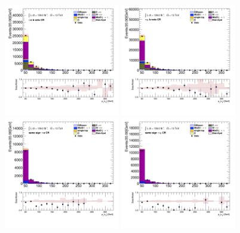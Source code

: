 		\begin{figure}[!thp]
			\begin{center}    
			\includegraphics[width=0.45\textwidth]{chapters/chapter6_HPlus/images/taulep/tau_0_pt_TAUEL_BVETO.png} 
			\includegraphics[width=0.45\textwidth]{chapters/chapter6_HPlus/images/taulep/tau_0_pt_TAUMU_BVETO.png} \\
			\includegraphics[width=0.45\textwidth]{chapters/chapter6_HPlus/images/taulep/tau_0_pt_SS_TAUEL.png} 
			\includegraphics[width=0.45\textwidth]{chapters/chapter6_HPlus/images/taulep/tau_0_pt_SS_TAUMU.png} \\

\end{center}
\end{figure}
